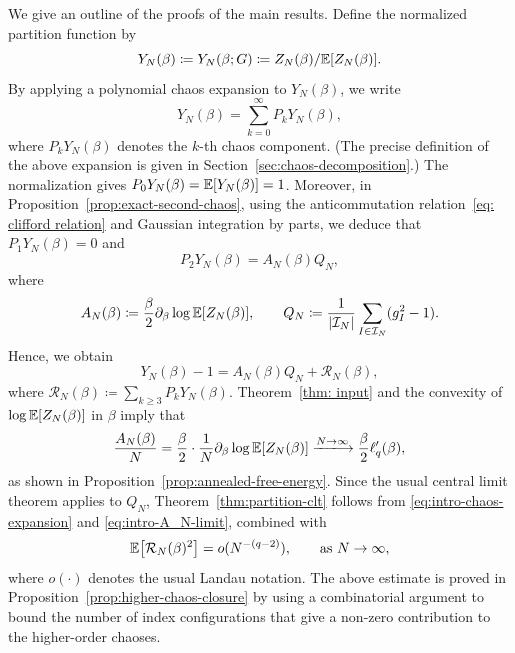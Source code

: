 \documentclass[../CLT_SYK.tex]{subfiles}
\begin{document}
We give an outline of the proofs of the main results.
Define the normalized partition function by
\begin{equation} \label{eq:Y_N}
  Y_N(\beta) \coloneqq Y_N(\beta; G) \coloneqq {Z_N(\beta)}/{\mathbb E[Z_N(\beta)]}.
\end{equation}
By applying a polynomial chaos expansion to $Y_N(\beta)$, we write 
\[
  Y_N(\beta) = \sum_{k = 0}^\infty P_kY_N(\beta),
\]
where $P_k Y_N(\beta)$ denotes the $k$-th chaos component.
(The precise definition of the above expansion is given in Section~\ref{sec:chaos-decomposition}.) The normalization gives $P_0 Y_N(\beta) = \mathbb E [Y_N(\beta)] = 1$. Moreover, in {Proposition~\ref{prop:exact-second-chaos}}, using the anticommutation relation~\eqref{eq: clifford relation} and Gaussian integration by parts, we deduce that $P_1 Y_N(\beta) = 0$ and
\[ 
  P_2Y_N(\beta) = A_N(\beta) Q_N,
\]
where
\begin{equation}\label{eq:finite-N-FTW-coefficient}
      A_N(\beta) \coloneqq \frac{\beta}{2}\partial_\beta\log \mathbb E[Z_N(\beta)],
  \qquad
    Q_N \coloneqq \frac1{|\mathcal I_N|}\sum_{I\in\mathcal I_N}(g_I^2-1).
\end{equation}
Hence, we obtain
\begin{equation}\label{eq:intro-chaos-expansion}
  Y_N(\beta)-1=
  A_N(\beta)Q_N+\mathcal R_N(\beta),
\end{equation}
where $\mathcal R_N(\beta) \coloneqq \sum_{k \geq 3} P_k Y_N(\beta)$.
Theorem~\ref{thm: input} and the convexity of $\log \mathbb E[Z_N(\beta)]$ in $\beta$ imply that
\begin{equation}\label{eq:intro-A_N-limit}
  \frac{A_N(\beta)}N
  = 
  \frac{\beta}{2}\cdot \frac{1}{N}\partial_\beta\log \E[Z_N(\beta)]
  \xlongrightarrow{N \to \infty} \frac{\beta}{2}\ell_q'(\beta),
\end{equation}
as shown in Proposition~\ref{prop:annealed-free-energy}.
Since the usual central limit theorem applies to $Q_N$, Theorem~\ref{thm:partition-clt} follows from \eqref{eq:intro-chaos-expansion} and \eqref{eq:intro-A_N-limit}, combined with  
\begin{equation}\label{eq:intro-higher-chaoses}
  \mathbb E \bigl[ \mathcal R_N(\beta)^2 \bigr]= o(N^{-(q-2)}),\qquad \text{as } N \to \infty,
\end{equation}
where $o(\cdot)$ denotes the usual Landau notation.
The above estimate is proved in Proposition~\ref{prop:higher-chaos-closure} 
 {by using a combinatorial argument to bound the number of index configurations that give a non-zero contribution to the higher-order chaoses.}
\end{document}
